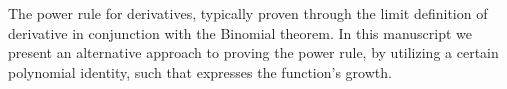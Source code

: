 The power rule for derivatives, typically proven through the limit definition of derivative in conjunction with the
Binomial theorem.
In this manuscript we present an alternative approach to proving the power rule,
by utilizing a certain polynomial identity, such that expresses the function's growth.
